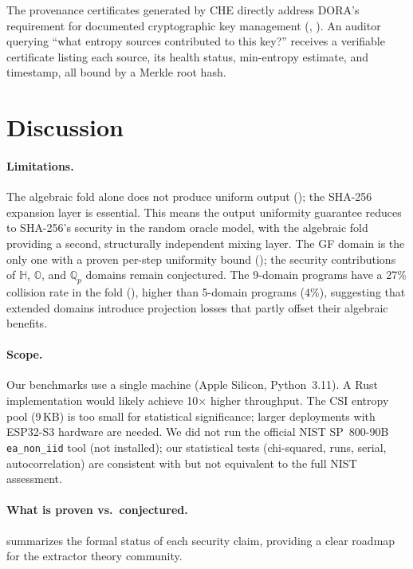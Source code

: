 \documentclass[11pt,a4paper]{article}
\newcommand{\che}{\textsc{CHE}\xspace}
\newcommand{\Q}{\mathbb{Q}}
\begin{document}
The provenance certificates generated by \che directly address
DORA's requirement for documented cryptographic key management
(, ).
%
An auditor querying ``what entropy sources contributed to this key?''
receives a verifiable certificate listing each source, its health
status, min-entropy estimate, and timestamp, all bound by a Merkle
root hash.


\section{Discussion}
\label{sec:discussion}

\paragraph{Limitations.}
The algebraic fold alone does not produce uniform output
(); the SHA-256 expansion layer is essential.
%
This means the output uniformity guarantee reduces to SHA-256's
security in the random oracle model, with the algebraic fold
providing a second, structurally independent mixing layer.
%
The GF domain is the only one with a proven per-step uniformity
bound (); the security contributions of
$\mathbb{H}$, $\mathbb{O}$, and $\Q_p$ domains remain
conjectured.
%
The 9-domain programs have a 27\% collision rate in the fold
(), higher than 5-domain programs (4\%),
suggesting that extended domains introduce projection losses that
partly offset their algebraic benefits.

\paragraph{Scope.}
Our benchmarks use a single machine (Apple Silicon, Python~3.11).
A Rust implementation would likely achieve 10$\times$ higher
throughput.
%
The CSI entropy pool (9\,KB) is too small for statistical
significance; larger deployments with ESP32-S3 hardware are needed.
%
We did not run the official NIST SP~800-90B \texttt{ea\_non\_iid}
tool (not installed); our statistical tests (chi-squared, runs,
serial, autocorrelation) are consistent with but not equivalent to
the full NIST assessment.

\paragraph{What is proven vs.\ conjectured.}
 summarizes the formal status of
each security claim, providing a clear roadmap for the extractor
theory community.
\end{document}
